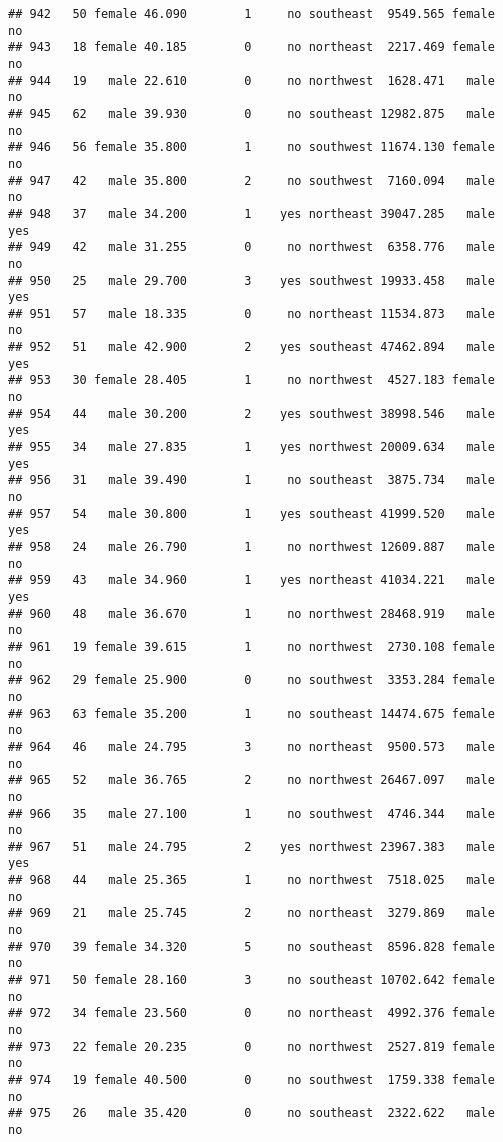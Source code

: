 \documentclass[
]{article}
\begin{document}
\begin{verbatim}
## 942   50 female 46.090        1     no southeast  9549.565 female       no
## 943   18 female 40.185        0     no northeast  2217.469 female       no
## 944   19   male 22.610        0     no northwest  1628.471   male       no
## 945   62   male 39.930        0     no southeast 12982.875   male       no
## 946   56 female 35.800        1     no southwest 11674.130 female       no
## 947   42   male 35.800        2     no southwest  7160.094   male       no
## 948   37   male 34.200        1    yes northeast 39047.285   male      yes
## 949   42   male 31.255        0     no northwest  6358.776   male       no
## 950   25   male 29.700        3    yes southwest 19933.458   male      yes
## 951   57   male 18.335        0     no northeast 11534.873   male       no
## 952   51   male 42.900        2    yes southeast 47462.894   male      yes
## 953   30 female 28.405        1     no northwest  4527.183 female       no
## 954   44   male 30.200        2    yes southwest 38998.546   male      yes
## 955   34   male 27.835        1    yes northwest 20009.634   male      yes
## 956   31   male 39.490        1     no southeast  3875.734   male       no
## 957   54   male 30.800        1    yes southeast 41999.520   male      yes
## 958   24   male 26.790        1     no northwest 12609.887   male       no
## 959   43   male 34.960        1    yes northeast 41034.221   male      yes
## 960   48   male 36.670        1     no northwest 28468.919   male       no
## 961   19 female 39.615        1     no northwest  2730.108 female       no
## 962   29 female 25.900        0     no southwest  3353.284 female       no
## 963   63 female 35.200        1     no southeast 14474.675 female       no
## 964   46   male 24.795        3     no northeast  9500.573   male       no
## 965   52   male 36.765        2     no northwest 26467.097   male       no
## 966   35   male 27.100        1     no southwest  4746.344   male       no
## 967   51   male 24.795        2    yes northwest 23967.383   male      yes
## 968   44   male 25.365        1     no northwest  7518.025   male       no
## 969   21   male 25.745        2     no northeast  3279.869   male       no
## 970   39 female 34.320        5     no southeast  8596.828 female       no
## 971   50 female 28.160        3     no southeast 10702.642 female       no
## 972   34 female 23.560        0     no northeast  4992.376 female       no
## 973   22 female 20.235        0     no northwest  2527.819 female       no
## 974   19 female 40.500        0     no southwest  1759.338 female       no
## 975   26   male 35.420        0     no southeast  2322.622   male       no

\end{verbatim}
\end{document}
